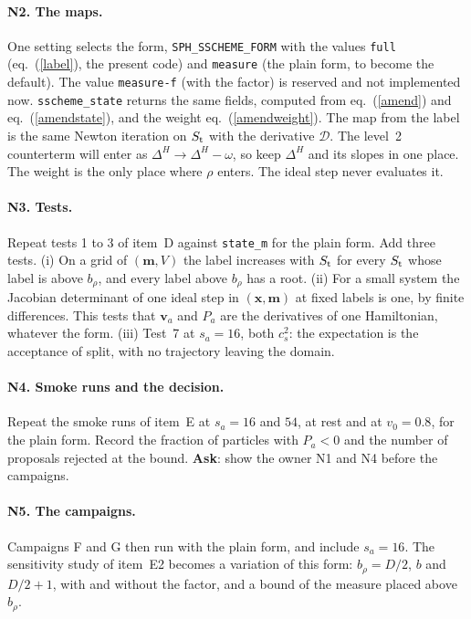 \documentclass[11pt,aps,preprint,nofootinbib,superscriptaddress,tightenlines]{revtex4-2}
\def\Eq#1{eq.~(\ref{#1})}
\let\oldparagraph\paragraph
\renewcommand{\paragraph}{\par\bigskip\oldparagraph}
\begin{document}
\paragraph{N2. The maps.}  One setting selects the form, \texttt{SPH\_SSCHEME\_FORM} with the values \texttt{full} (\Eq{label}, the present code)
and \texttt{measure} (the plain form, to become the default).  The value \texttt{measure-f} (with the factor) is reserved and not implemented now.  \texttt{sscheme\_state} returns the same fields, computed from \Eq{amend} and
\Eq{amendstate}, and the weight \Eq{amendweight}.  The map from the label is the same Newton iteration on $S_{\rm t}$ with the derivative
$\mathcal D$.  The level~2 counterterm will enter as $\Delta^H\to\Delta^H-\omega$, so keep $\Delta^H$ and its slopes in one place.  The weight is the
only place where $\rho$ enters.  The ideal step never evaluates it.

\paragraph{N3. Tests.}  Repeat tests 1 to 3 of item~D against \texttt{state\_m} for the plain form.  Add three tests.  (i) On a grid of $(\bm m,V)$ the
label increases with $S_{\rm t}$ for every $S_{\rm t}$ whose label is above $b_\rho$, and every label above $b_\rho$ has a root.  (ii) For a small system
the Jacobian determinant of one ideal step in $(\bm x,\bm m)$ at fixed labels is one, by finite differences.  This tests that $\bm v_a$ and $P_a$ are
the derivatives of one Hamiltonian, whatever the form.  (iii) Test~7 at $s_a=16$, both $c_s^2$: the expectation is the acceptance of split, with no
trajectory leaving the domain.

\paragraph{N4. Smoke runs and the decision.}  Repeat the smoke runs of item~E at $s_a=16$ and $54$, at rest and at $v_0=0.8$, for the plain form.  Record
the fraction of particles with $P_a<0$ and the number of proposals rejected at the bound.  \textbf{Ask}: show the owner N1 and N4 before the campaigns.

\paragraph{N5. The campaigns.}  Campaigns F and G then run with the plain form, and include $s_a=16$.  The sensitivity study of item~E2 becomes a
variation of this form: $b_\rho=D/2$, $b$ and $D/2+1$, with and without the factor, and a bound of the measure placed above $b_\rho$.
\end{document}
